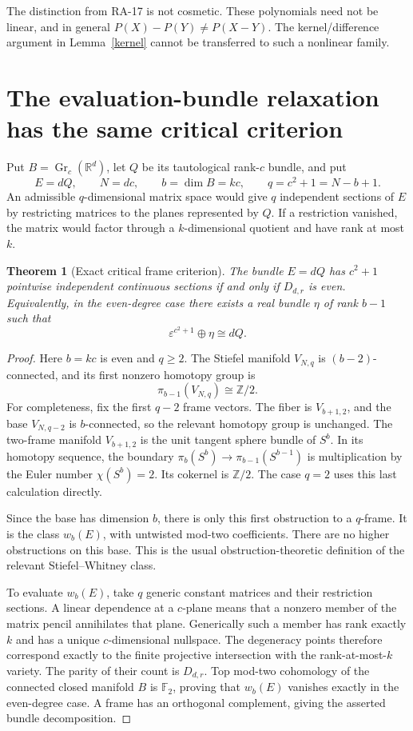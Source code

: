 \documentclass[11pt]{article}
\newtheorem{theorem}{Theorem}[section]
\theoremstyle{remark}\newtheorem{remark}[theorem]{Remark}
\newcommand{\R}{\mathbb R}\newcommand{\C}{\mathbb C}\newcommand{\Q}{\mathbb Q}
\newcommand{\Z}{\mathbb Z}\newcommand{\F}{\mathbb F_2}
\newcommand{\eps}{\varepsilon}\newcommand{\Gr}{\operatorname{Gr}}
\begin{document}
The distinction from RA-17 is not cosmetic. These polynomials need not be
linear, and in general $P(X)-P(Y)\ne P(X-Y)$. The kernel/difference argument
in Lemma~\ref{kernel} cannot be transferred to such a nonlinear family.

\section{The evaluation-bundle relaxation has the same critical criterion}
Put $B=\Gr_c(\R^d)$, let $Q$ be its tautological rank-$c$ bundle, and put
\[
 E=dQ,\qquad N=dc,\qquad b=\dim B=kc,
 \qquad q=c^2+1=N-b+1.
\]
An admissible $q$-dimensional matrix space would give $q$ independent sections
of $E$ by restricting matrices to the planes represented by $Q$. If a
restriction vanished, the matrix would factor through a $k$-dimensional
quotient and have rank at most $k$.

\begin{theorem}[Exact critical frame criterion]\label{frames}
The bundle $E=dQ$ has $c^2+1$ pointwise independent continuous sections if and
only if $D_{d,r}$ is even. Equivalently, in the even-degree case there exists a
real bundle $\eta$ of rank $b-1$ such that
\[
 \eps^{c^2+1}\oplus\eta\cong dQ.
\]
\end{theorem}
\begin{proof}
Here $b=kc$ is even and $q\ge2$. The Stiefel manifold $V_{N,q}$ is
$(b-2)$-connected, and its first nonzero homotopy group is
\[
 \pi_{b-1}(V_{N,q})\cong\Z/2.
\]
For completeness, fix the first $q-2$ frame vectors. The fiber is
$V_{b+1,2}$, and the base $V_{N,q-2}$ is $b$-connected, so the relevant
homotopy group is unchanged. The two-frame manifold $V_{b+1,2}$ is the unit
tangent sphere bundle of $S^b$. In its homotopy sequence, the boundary
$\pi_b(S^b)\to\pi_{b-1}(S^{b-1})$ is multiplication by the Euler number
$\chi(S^b)=2$. Its cokernel is $\Z/2$. The case $q=2$ uses this last
calculation directly.

Since the base has dimension $b$, there is only this first obstruction to a
$q$-frame. It is the class $w_b(E)$, with untwisted mod-two coefficients.
There are no higher obstructions on this base. This is the usual
obstruction-theoretic definition of the relevant Stiefel--Whitney class.

To evaluate $w_b(E)$, take $q$ generic constant matrices and their restriction
sections. A linear dependence at a $c$-plane means that a nonzero member of
the matrix pencil annihilates that plane. Generically such a member has rank
exactly $k$ and has a unique $c$-dimensional nullspace. The degeneracy points
therefore correspond exactly to the finite projective intersection with the
rank-at-most-$k$ variety. The parity of their count is $D_{d,r}$. Top
mod-two cohomology of the connected closed manifold $B$ is $\F$, proving
that $w_b(E)$ vanishes exactly in the even-degree case. A frame has an
orthogonal complement, giving the asserted bundle decomposition.
\end{proof}
\end{document}
